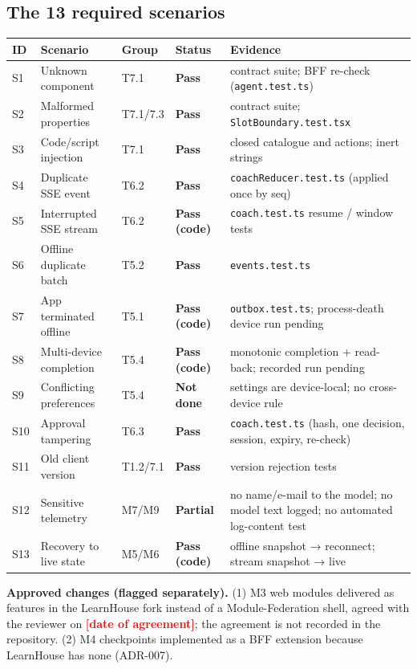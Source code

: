 \documentclass[11pt,a4paper]{article}
\newcommand{\pass}{\textcolor{okgreen}{\textbf{Pass}}}
\newcommand{\passcode}{\textcolor{okgreen}{\textbf{Pass (code)}}}
\newcommand{\partl}{\textcolor{partial}{\textbf{Partial}}}
\newcommand{\notdone}{\textcolor{notdone}{\textbf{Not done}}}
\newcommand{\fillin}[1]{\textcolor{red}{\textbf{[#1]}}}
\newcommand{\fp}[1]{\nolinkurl{#1}}
\begin{document}
\subsection{The 13 required scenarios}
\begin{xltabular}{\textwidth}{L{0.05\textwidth}L{0.24\textwidth}L{0.1\textwidth}L{0.12\textwidth}Y}
\toprule
\textbf{ID} & \textbf{Scenario} & \textbf{Group} & \textbf{Status} & \textbf{Evidence} \\
\midrule
S1 & Unknown component & T7.1 & \pass & contract suite; BFF re-check (\fp{agent.test.ts}) \\
S2 & Malformed properties & T7.1/7.3 & \pass & contract suite; \fp{SlotBoundary.test.tsx} \\
S3 & Code/script injection & T7.1 & \pass & closed catalogue and actions; inert strings \\
S4 & Duplicate SSE event & T6.2 & \pass & \fp{coachReducer.test.ts} (applied once by seq) \\
S5 & Interrupted SSE stream & T6.2 & \passcode & \fp{coach.test.ts} resume / window tests \\
S6 & Offline duplicate batch & T5.2 & \pass & \texttt{events.test.ts} \\
S7 & App terminated offline & T5.1 & \passcode & \fp{outbox.test.ts}; process-death device run pending \\
S8 & Multi-device completion & T5.4 & \passcode & monotonic completion + read-back; recorded run pending \\
S9 & Conflicting preferences & T5.4 & \notdone & settings are device-local; no cross-device rule \\
S10 & Approval tampering & T6.3 & \pass & \fp{coach.test.ts} (hash, one decision, session, expiry, re-check) \\
S11 & Old client version & T1.2/7.1 & \pass & version rejection tests \\
S12 & Sensitive telemetry & M7/M9 & \partl & no name/e-mail to the model; no model text logged; no automated log-content test \\
S13 & Recovery to live state & M5/M6 & \passcode & offline snapshot → reconnect; stream snapshot → live \\
\bottomrule
\end{xltabular}

\textbf{Approved changes (flagged separately).} (1) M3 web modules delivered as features in the
LearnHouse fork instead of a Module-Federation shell, agreed with the reviewer on
\fillin{date of agreement}; the agreement is not recorded in the repository. (2) M4 checkpoints
implemented as a BFF extension because LearnHouse has none (ADR-007).
\end{document}
